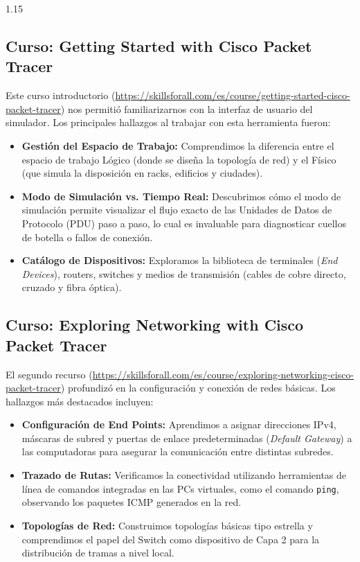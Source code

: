 \documentclass[11pt, a4paper]{article}
\begin{document}
\begin{spacing}{1.15}
\subsection{Curso: Getting Started with Cisco Packet Tracer}
Este curso introductorio (\url{https://skillsforall.com/es/course/getting-started-cisco-packet-tracer}) \cite{cisco_skills_gettingstarted} nos permitió familiarizarnos con la interfaz de usuario del simulador. Los principales hallazgos al trabajar con esta herramienta fueron:
\begin{itemize}
    \item \textbf{Gestión del Espacio de Trabajo:} Comprendimos la diferencia entre el espacio de trabajo Lógico (donde se diseña la topología de red) y el Físico (que simula la disposición en racks, edificios y ciudades).
    \item \textbf{Modo de Simulación vs. Tiempo Real:} Descubrimos cómo el modo de simulación permite visualizar el flujo exacto de las Unidades de Datos de Protocolo (PDU) paso a paso, lo cual es invaluable para diagnosticar cuellos de botella o fallos de conexión.
    \item \textbf{Catálogo de Dispositivos:} Exploramos la biblioteca de terminales (\textit{End Devices}), routers, switches y medios de transmisión (cables de cobre directo, cruzado y fibra óptica).
\end{itemize}

\subsection{Curso: Exploring Networking with Cisco Packet Tracer}
El segundo recurso (\url{https://skillsforall.com/es/course/exploring-networking-cisco-packet-tracer}) \cite{cisco_skills_exploring} profundizó en la configuración y conexión de redes básicas. Los hallazgos más destacados incluyen:
\begin{itemize}
    \item \textbf{Configuración de End Points:} Aprendimos a asignar direcciones IPv4, máscaras de subred y puertas de enlace predeterminadas (\textit{Default Gateway}) a las computadoras para asegurar la comunicación entre distintas subredes.
    \item \textbf{Trazado de Rutas:} Verificamos la conectividad utilizando herramientas de línea de comandos integradas en las PCs virtuales, como el comando \texttt{ping}, observando los paquetes ICMP generados en la red.
    \item \textbf{Topologías de Red:} Construimos topologías básicas tipo estrella y comprendimos el papel del Switch como dispositivo de Capa 2 para la distribución de tramas a nivel local.
\end{itemize}


\end{spacing}
\end{document}
